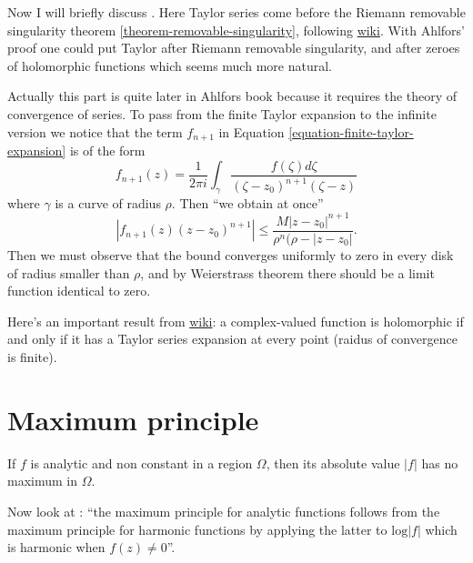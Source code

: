 \medskip\noindent
\begin{remark}
\label{remark-taylor-before}
Now I will briefly discuss \cite[Section 1.2,
Chapter 5]{Ahlfors}.
Here Taylor series come before the
Riemann removable singularity theorem
\ref{theorem-removable-singularity},
following
\href{https://en.wikipedia.org/wiki/%
Removable_singularity}{wiki}.
With Ahlfors' proof one could put Taylor after
Riemann removable singularity, and after
zeroes of holomorphic functions
which seems much more natural.
\end{remark}

\medskip\noindent
Actually this part is quite later in Ahlfors
book because it requires
the theory of convergence of series.
To pass from the finite Taylor expansion to
the
infinite version we notice that the
term $f_{n+1}$ in Equation
\ref{equation-finite-taylor-expansion}
is of the form
$$
f_{n+1}(z)=\frac{1}{2\pi i}\int_\gamma
\frac{f(\zeta)d\zeta}
{(\zeta-z_0)^{n+1}(\zeta-z)}
$$
where $\gamma$ is a curve of radius $\rho$.
Then ``we obtain at once''
$$
|f_{n+1}(z)(z-z_0)^{n+1}|\leq
\frac{M|z-z_0|^{n+1}}{\rho^n(\rho-|z-z_0|}.
$$
Then we must observe that the bound converges
uniformly
to zero in every disk of radius smaller than
$\rho$,
and by Weierstrass theorem there should be a
limit
function identical to zero.

\medskip\noindent
Here's an important result from
\href{https://en.wikipedia.org/wiki/%
Analyticity_of_holomorphic_functions}{wiki}:
a complex-valued function is holomorphic if
and only if it
has a Taylor series expansion at every point
(raidus of convergence is finite).


\section{Maximum principle}
\label{section-maximum-principle}

\begin{theorem}
\label{theorem-maximum-principle}
\begin{reference}
\cite[Theorem 12, p.134]{ahl}
\end{reference}
If $f$ is analytic and non constant in a
region $\Omega$,
then its absolute value $|f|$ has no maximum
in $\Omega$.
\end{theorem}

Now look at \cite[p. 166]{ahl}:
``the maximum principle for analytic
functions
follows from the maximum principle for
harmonic functions
by applying the latter to $\text{log}|f|$
which is harmonic
when $f(z)\neq 0$''.

